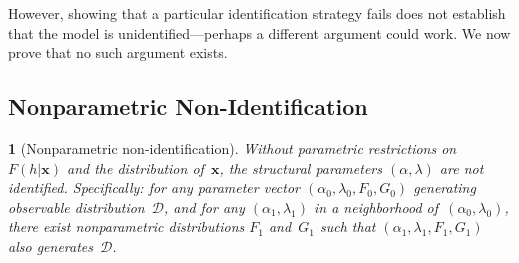 \documentclass[12pt]{article}
\theoremstyle{plain}
\theoremstyle{plain}
\newtheorem{prop}[thm]{\protect\propositionname}
\theoremstyle{definition}  %
\theoremstyle{remark}  %
\providecommand{\propositionname}{Proposition}
\begin{document}
However, showing that a particular identification strategy fails does not establish that the model is unidentified---perhaps a different argument could work.  We now prove that no such argument exists.


\subsection{Nonparametric Non-Identification}\label{sec:nonid_formal}

\begin{prop}[Nonparametric non-identification]\label{prop:nonid}
Without parametric restrictions on $F(h|\mathbf{x})$ and the distribution of~$\mathbf{x}$, the structural parameters $(\alpha, \lambda)$ are not identified.  Specifically: for any parameter vector $(\alpha_0, \lambda_0, F_0, G_0)$ generating observable distribution~$\mathcal{D}$, and for any $(\alpha_1, \lambda_1)$ in a neighborhood of~$(\alpha_0, \lambda_0)$, there exist nonparametric distributions $F_1$ and~$G_1$ such that $(\alpha_1, \lambda_1, F_1, G_1)$ also generates~$\mathcal{D}$.
\end{prop}
\end{document}
